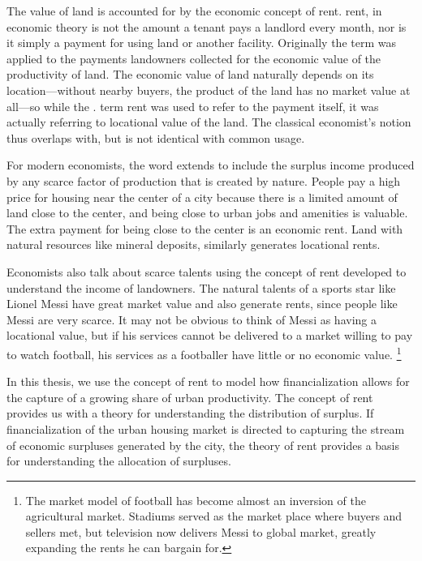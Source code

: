 The value of land is accounted for by the economic concept of rent. \Gls{rent}, in economic theory is not the amount a tenant pays a landlord every month, nor is it simply a payment for using land or another facility. Originally the term was applied to the payments landowners collected for the economic value of the productivity of land. The economic value of land naturally depends on its location---without  nearby buyers, the product of the land has no market value at all---so while the . %
term rent was used to refer to the payment itself, it was actually referring to locational value of the land. The classical economist's notion thus overlaps with, but is not identical with common usage. 

For modern economists, the word extends to include the \gls{surplus} income produced by any scarce factor of production that is created by nature. %
People pay a high price for housing near the center of a city because there is a limited amount of land close to the center, and being close to urban jobs and amenities is valuable. The extra payment for being close to the center is an \gls{economic rent}. 
Land with natural resources like mineral deposits, similarly generates locational rents. 

Economists also talk about scarce talents using the concept of rent developed to understand the income of landowners.  The natural talents of a sports star like Lionel Messi have great market value and  also generate rents, since people like Messi are very scarce. It may not be obvious to think of Messi as having a locational value, but if his services cannot be delivered to a market willing to pay to watch football, his services as a footballer have little or no economic value.%
\footnote{The market model of football has become almost an inversion of the agricultural market. Stadiums served as the market place where buyers and sellers met, but television now delivers Messi to global market, greatly expanding the rents he can bargain for.} 

In this thesis, we use the concept of rent to model how financialization allows for the capture  of a growing share of urban productivity. The concept of rent provides us with a theory for understanding the distribution of surplus. If financialization of the urban housing market is directed to capturing the stream of economic surpluses generated by the city, the theory of rent provides a basis for understanding the allocation of surpluses.

